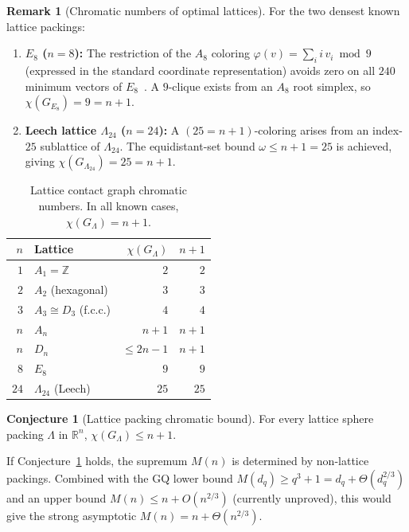 \documentclass{article}
\theoremstyle{definition}
\newtheorem{remark}[theorem]{Remark}
\newtheorem{conjecture}[theorem]{Conjecture}
\begin{document}
\begin{remark}[Chromatic numbers of optimal lattices]\label{rem:optimal-lattices}
For the two densest known lattice packings:
\begin{enumerate}
  \item[\textup{(a)}] \textbf{$E_8$ ($n=8$):}  The restriction of the $A_8$ coloring $\varphi(v) = \sum_i i\,v_i \bmod 9$ (expressed in the standard coordinate representation) avoids zero on all $240$ minimum vectors of $E_8$~\cite{BvM2022}.  A $9$-clique exists from an $A_8$ root simplex, so $\chi(G_{E_8}) = 9 = n+1$.
  \item[\textup{(b)}] \textbf{Leech lattice $\Lambda_{24}$ ($n=24$):}  A $(25 = n+1)$-coloring arises from an index-$25$ sublattice of $\Lambda_{24}$.  The equidistant-set bound $\omega \le n+1 = 25$ is achieved, giving $\chi(G_{\Lambda_{24}}) = 25 = n+1$.
\end{enumerate}
\end{remark}

\begin{table}[ht]
\centering
\begin{tabular}{r|l|r|r}
$n$ & Lattice & $\chi(G_\Lambda)$ & $n+1$ \\ \hline
$1$ & $A_1 = \mathbb{Z}$ & $2$ & $2$ \\
$2$ & $A_2$ (hexagonal) & $3$ & $3$ \\
$3$ & $A_3 \cong D_3$ (f.c.c.) & $4$ & $4$ \\
$n$ & $A_n$ & $n+1$ & $n+1$ \\
$n$ & $D_n$ & $\le 2n-1$ & $n+1$ \\
$8$ & $E_8$ & $9$ & $9$ \\
$24$ & $\Lambda_{24}$ (Leech) & $25$ & $25$ \\
\end{tabular}
\caption{Lattice contact graph chromatic numbers.  In all known cases, $\chi(G_\Lambda) = n+1$.}
\end{table}

\begin{conjecture}[Lattice packing chromatic bound]\label{conj:lattice-linear}
For every lattice sphere packing $\Lambda$ in $\mathbb{R}^n$, $\chi(G_\Lambda) \le n + 1$.
\end{conjecture}

If Conjecture~\ref{conj:lattice-linear} holds, the supremum $M(n)$ is determined by non-lattice packings.  Combined with the GQ lower bound $M(d_q) \ge q^3+1 = d_q + \Theta(d_q^{2/3})$ and an upper bound $M(n) \le n + O(n^{2/3})$ (currently unproved), this would give the strong asymptotic $M(n) = n + \Theta(n^{2/3})$.
\end{document}

